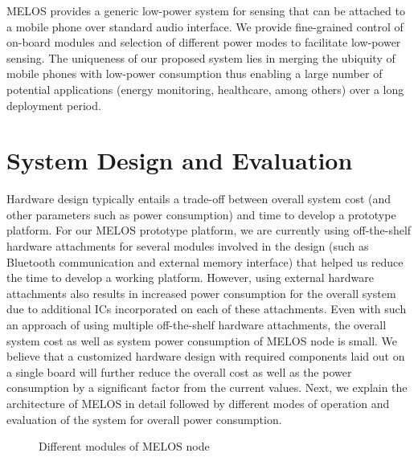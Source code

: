 \documentclass[10pt]{sigplan-proc-varsize}
\newcommand{\melos}{MELOS }
\begin{document}
\melos provides a generic low-power system for sensing that can be attached to a mobile phone over standard audio interface. We provide fine-grained control of on-board modules and selection of different power modes to facilitate low-power sensing. The uniqueness of our proposed system lies in merging the ubiquity of mobile phones with low-power consumption thus enabling a large number of potential applications (energy monitoring, healthcare, among others) over a long deployment period.

\section{System Design and Evaluation}
\label{sec:sysDes}
Hardware design typically entails a trade-off between overall system cost (and other parameters such as power consumption) and time to develop a prototype platform. For our \melos prototype platform, we are currently using off-the-shelf hardware attachments for several modules involved in the design (such as Bluetooth communication and external memory interface) that helped us reduce the time to develop a working platform. However, using external hardware attachments also results in increased power consumption for the overall system due to additional ICs incorporated on each of these attachments. Even with such an approach of using multiple off-the-shelf hardware attachments, the overall system cost as well as system power consumption of \melos node is small. We believe that a customized hardware design with required components laid out on a single board will further reduce the overall cost as well as the power consumption by a significant factor from the current values. Next, we explain the architecture of \melos in detail followed by different modes of operation and evaluation of the system for overall power consumption.

\begin{figure}
\centering
{}
\caption{Different modules of \melos node}
\label{fig:meloscircuit}
\vspace{-5mm}
\end{figure}
\end{document}
